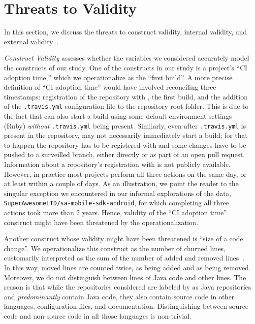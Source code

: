 
\section{Threats to Validity}
\label{sec:threats}
In this section, we discuss the threats to construct validity, internal validity, 
and external validity~\cite{perry2000empirical}.

\smallskip \emph{Construct Validity} assesses whether the variables we 
considered accurately model the constructs of our study. 
One of the constructs in our study is a project's ``CI adoption time,'' which 
we operationalize as the ``first \Tvis build''. 
A more precise definition of ``CI adoption time'' would have involved 
reconciling three timestamps: registration of the repository with \Tvis, the 
first build, and the addition of the \texttt{.travis.yml} configuration file to the
repository root folder.
This is due to the fact that \Tvis can also start a build using some default 
environment settings (Ruby) \emph{without} \texttt{.travis.yml} being present.
Similarly, even after \texttt{.travis.yml} is present in the repository, \Tvis may 
not necessarily immediately start a build; for that to happen the repository 
has to be registered with \Tvis and some changes have to be pushed to a
surveilled branch, either directly or as part of an open pull request. 
Information about a repository's registration with \Tvis is not publicly available. 
However, in practice most projects perform all three actions on the same day, 
or at least within a couple of days.
As an illustration, we point the reader to the singular exception we encountered
in our informal explorations of the data, \texttt{SuperAwesomeLTD/sa-mobile-sdk-android},
for which completing all three actions took more than 2 years.
Hence, validity of the ``CI adoption time'' construct might have been threatened 
by the operationalization.

Another construct whose validity might have been threatened is ``size of a 
code change''.
We operationalize this construct as the number of churned lines, customarily 
interpreted as the sum of the number of added and removed lines~\cite{GigerPG}. 
In this way, moved lines are counted twice, as being added and as being removed.
Moreover, we do not distinguish between lines of Java code and other lines. 
The reason is that while the repositories considered are labeled by \GH as 
Java repositories and \emph{predominantly} contain Java code, they also 
contain source code in other languages, configuration files, and documentation. 
Distinguishing between source code and non-source code in all those 
languages is non-trivial.

